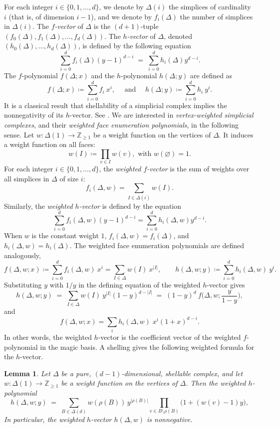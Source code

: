 \documentclass[11pt,a4paper,reqno]{amsart}
\theoremstyle{results}
\newtheorem{lemma}[thm]{Lemma}
\theoremstyle{definitions}
\def\Z{\mathbb{Z}}
\def\Z{\mathbb{Z}}
\newcommand{\abs}[1]{\left\lvert#1\right\rvert}
\begin{document}
For each integer $i\in \{0,1,\ldots,d\}$, we denote by $\Delta(i)$ the simplices of cardinality $i$ (that is, of dimension $i-1$), and we denote by $f_i(\Delta)$ the number of simplices in $\Delta(i)$.
The \emph{$f$-vector} of $\Delta$ is the $(d+1)$-tuple $(f_0(\Delta), f_1(\Delta), \dots, f_{d}(\Delta))$. The \emph{$h$-vector} of $\Delta$, denoted $(h_0(\Delta),\ldots,h_{d}(\Delta))$, is defined by the following equation
\[
  \sum_{i=0}^d f_{i}(\Delta)(y-1)^{d-i}
  \;=\;
  \sum_{i=0}^d h_i(\Delta) y^{d-i}.
\]
The $f$-polynomial $f(\Delta; x)$ and the $h$-polynomial $h(\Delta; y)$ are defined as
\[
  f(\Delta; x) \coloneqq \sum_{i=0}^d f_{i} \: x^i,
  \quad \text{ and } \quad
  h(\Delta; y) \coloneqq \sum_{i=0}^d h_i \: y^i.
\]
It is a classical result that shellability of a simplicial complex implies the nonnegativity of its $h$-vector. See \cite{stanley1996combinatorics}.
We are interested in \emph{vertex-weighted simplicial complexes}, and their \emph{weighted face enumeration polynomials}, in the following sense.
Let $w \colon \Delta(1) \to \Z_{\geqslant 1}$ be a weight function on the vertices of $\Delta$. It induces a weight function on all faces:
\[
w(I) \coloneqq \prod_{v \in I} w(v), \text{ with } w(\varnothing) = 1.
\] For each integer $i \in \{0, 1, \ldots, d\}$, the \emph{weighted $f$-vector} is the sum of weights over all simplices in $\Delta$ of size $i$:
\[
f_i(\Delta, w) = \sum_{I \in \Delta(i)} w(I).
\] Similarly, the \emph{weighted $h$-vector} is defined by the equation
\[
\sum_{i = 0}^{d} f_i(\Delta, w)(y-1)^{d-i} = \sum_{i = 0}^{d} h_i(\Delta, w) y^{d-i}.
\] When $w$ is the constant weight $1$, $f_i(\Delta, w) = f_i(\Delta)$, and $h_i(\Delta, w) = h_i(\Delta)$.
The weighted face enumeration polynomials are defined analogously,
\[
f(\Delta, w; x) \coloneqq \sum_{i = 0}^{d} f_i(\Delta, w) \: x^{i} = \sum_{I \in \Delta} w(I) \: x^{\abs{I}},
\qquad
h(\Delta, w; y) \coloneqq \sum_{i = 0}^{d} h_i(\Delta, w) \: y^{i}.
\]
Substituting $y$ with $1/y$ in the defining equation of the weighted $h$-vector gives
\begin{equation}
  \label{eq:weighted-h}
  h(\Delta, w; y)
  \;=\;
  \sum_{I \in \Delta} w(I) \: y^{\abs{I}} (1-y)^{d - \abs{I}}
  \;=\;
  (1-y)^{d} \: f\Big(\Delta, w; \frac{y}{1-y}\Big),
\end{equation}
and
\begin{equation}
  \label{eq:weighted-f}
  f(\Delta, w; x) = \sum_{i} h_i(\Delta, w) \; x^i (1 + x)^{d-i}.
\end{equation}
In other words, the weighted $h$-vector is the coefficient vector of the weighted $f$-polynomial in the magic basis.
A shelling gives the following weighted formula for the $h$-vector.
\begin{lemma}\label{lem:weighted-h}
  Let $\Delta$ be a pure, $(d-1)$-dimensional, shellable complex, and let
  $w \colon \Delta(1) \to \Z_{\geqslant 1}$ be a weight function on the vertices of $\Delta$.  Then the weighted $h$-polynomial
  \[
  h(\Delta, w; y) \;=\; \sum_{B \in \Delta(d)} w(\rho(B))\, y^{|\rho(B)|} \prod_{v \in B \setminus \rho(B)} \big(1 + (w(v) - 1) y\big),
  \]  In particular, the weighted
  $h$-vector $h(\Delta, w)$ is nonnegative.
\end{lemma}
\end{document}

